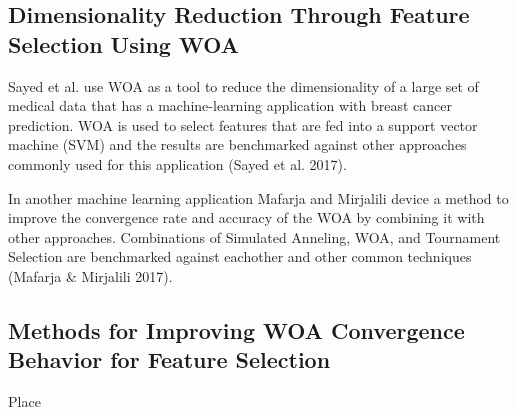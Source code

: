 \documentclass[11pt]{article}
\begin{document}
\subsection*{Dimensionality Reduction Through Feature Selection Using WOA} {
    Sayed et al. use WOA as a tool to reduce the dimensionality of a large set of medical data that has a machine-learning application with breast cancer prediction.
    WOA is used to select features that are fed into a support vector machine (SVM) and the results are benchmarked against other approaches commonly used for this application (Sayed et al. 2017).

    In another machine learning application Mafarja and Mirjalili device a method to improve the convergence rate and accuracy of the WOA by combining it with other approaches.
    Combinations of Simulated Anneling, WOA, and Tournament Selection are benchmarked against eachother and other common techniques (Mafarja \& Mirjalili 2017).
}
\subsection*{Methods for Improving WOA Convergence Behavior for Feature Selection} {
    Place
}
\end{document}
